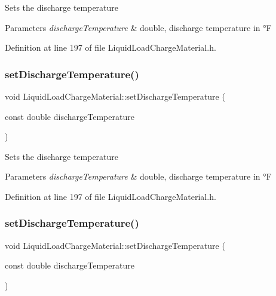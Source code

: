 Sets the discharge temperature 
\begin{DoxyParams}{Parameters}
{\em discharge\+Temperature} & double, discharge temperature in °F \\
\hline
\end{DoxyParams}


Definition at line 197 of file Liquid\+Load\+Charge\+Material.\+h.

\mbox{\label{class_liquid_load_charge_material_a04ef0778e524f531b6dd2dd6137c270d}} 
\subsubsection{\texorpdfstring{set\+Discharge\+Temperature()}{setDischargeTemperature()}\hspace{0.1cm}{\footnotesize\ttfamily [2/3]}}
{\footnotesize\ttfamily void Liquid\+Load\+Charge\+Material\+::set\+Discharge\+Temperature (\begin{DoxyParamCaption}\item[{const double}]{discharge\+Temperature }\end{DoxyParamCaption})\hspace{0.3cm}{\ttfamily [inline]}}

Sets the discharge temperature 
\begin{DoxyParams}{Parameters}
{\em discharge\+Temperature} & double, discharge temperature in °F \\
\hline
\end{DoxyParams}


Definition at line 197 of file Liquid\+Load\+Charge\+Material.\+h.

\mbox{\label{class_liquid_load_charge_material_a04ef0778e524f531b6dd2dd6137c270d}} 
\subsubsection{\texorpdfstring{set\+Discharge\+Temperature()}{setDischargeTemperature()}\hspace{0.1cm}{\footnotesize\ttfamily [3/3]}}
{\footnotesize\ttfamily void Liquid\+Load\+Charge\+Material\+::set\+Discharge\+Temperature (\begin{DoxyParamCaption}\item[{const double}]{discharge\+Temperature }\end{DoxyParamCaption})\hspace{0.3cm}{\ttfamily [inline]}}

